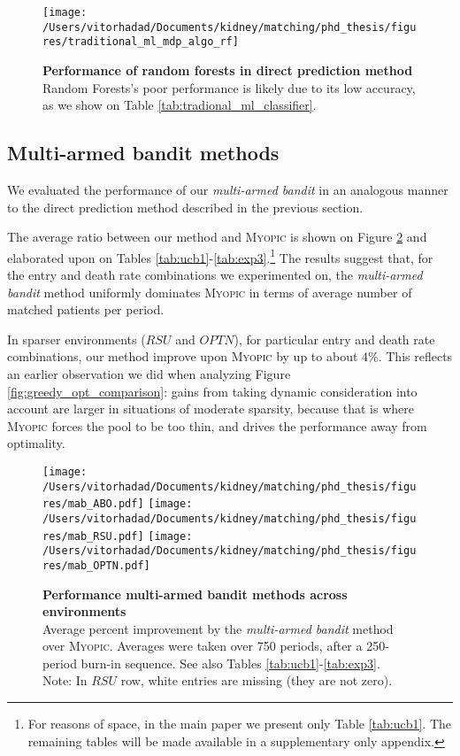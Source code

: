 \begin{figure}
\centering
\texttt{[image: /Users/vitorhadad/Documents/kidney/matching/phd\_thesis/figures/traditional\_ml\_mdp\_algo\_rf]}
\caption[Performance of random forests in direct prediction method]{\textbf{Performance of random forests in direct prediction method} \\
    Random Forests's poor performance is likely due to its low accuracy, as we show on Table \ref{tab:tradional_ml_classifier}.}
\label{fig:traditional_ml_mdp_algo_rf}
\end{figure}

\subsection{Multi-armed bandit methods}

We evaluated the performance of our \emph{multi-armed bandit} in an analogous manner to the direct prediction method described in the previous section.

The average ratio between our method and \textsc{Myopic} is shown on Figure \ref{fig:mab} and elaborated upon on Tables \ref{tab:ucb1}-\ref{tab:exp3}.\footnote{For reasons of space, in the main paper we present only Table \ref{tab:ucb1}. The remaining tables will be made available in a supplementary only appendix.} The results suggest that, for the entry and death rate combinations we experimented on, the \emph{multi-armed bandit} method uniformly dominates \textsc{Myopic} in terms of average number of matched patients per period.

In sparser environments ($RSU$ and $OPTN$), for particular entry and death rate combinations, our method improve upon \textsc{Myopic} by up to about 4\%. This reflects an earlier observation we did when analyzing Figure \ref{fig:greedy_opt_comparison}: gains from taking dynamic consideration into account are larger in situations of moderate sparsity, because that is where \textsc{Myopic} forces the pool to be too thin, and drives the performance away from optimality.


\begin{figure}
\centering
\hspace*{-1.6cm}
\texttt{[image: /Users/vitorhadad/Documents/kidney/matching/phd\_thesis/figures/mab\_ABO.pdf]}
\hspace*{-1.6cm}
\texttt{[image: /Users/vitorhadad/Documents/kidney/matching/phd\_thesis/figures/mab\_RSU.pdf]}
\hspace*{-1.6cm}
\texttt{[image: /Users/vitorhadad/Documents/kidney/matching/phd\_thesis/figures/mab\_OPTN.pdf]}
\caption[Performance of multi-armed bandit across environments]{\textbf{Performance multi-armed bandit methods across environments} \\
Average percent improvement by the \emph{multi-armed bandit} method over \textsc{Myopic}. Averages were taken over 750 periods, after a 250-period burn-in sequence. See also Tables \ref{tab:ucb1}-\ref{tab:exp3}. \\
{\scriptsize Note: In $RSU$ row, white entries are missing (they are not zero).}}
\label{fig:mab}
\end{figure}

